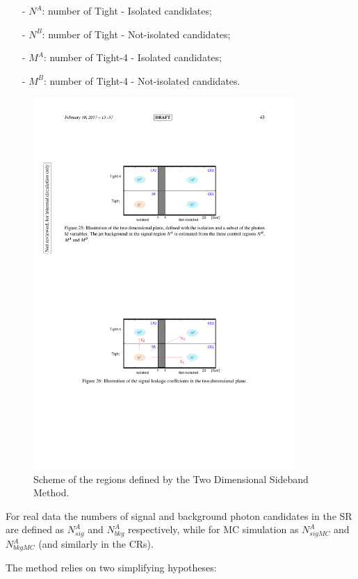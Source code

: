 \documentclass[11pt,a4paper,twoside,openright]{book}
\begin{document}
\begin{itemize}
    
    \item[-] $N^{A}$: number of Tight - Isolated candidates;
    \item[-] $N^{B}$: number of Tight - Not-isolated candidates;
    \item[-] $M^{A}$: number of Tight-4 - Isolated candidates;
    \item[-] $M^{B}$: number of Tight-4 - Not-isolated candidates.

\end{itemize}


\begin{figure}[hbtp!]
    \centering
    \includegraphics[width=10cm]{ABCD.pdf}
    \caption{Scheme of the regions defined by the Two Dimensional Sideband Method.}
    \label{fig:ABCD}
\end{figure}

For real data the numbers of signal and background photon candidates in the SR are defined as $N^{A}_{sig}$ and $N^{A}_{bkg}$ respectively, while for MC simulation as $N^{A}_{sigMC}$ and $N^{A}_{bkgMC}$ (and similarly in the CRs).

The method relies on two simplifying hypotheses:
\end{document}
